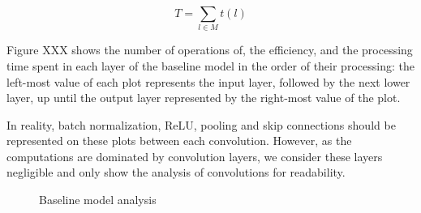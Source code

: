\documentclass[runningheads]{llncs}
\begin{document}
$$T = \sum_{l \in M} t(l)$$



Figure XXX shows the number of operations of, the efficiency, and the processing time spent in each layer of the baseline model in the order of their processing: the left-most value of each plot represents the input layer, followed by the next lower layer, up until the output layer represented by the right-most value of the plot.

In reality, batch normalization, ReLU, pooling and skip connections should be represented on these plots between each convolution.
However, as the computations are dominated by convolution layers, we consider these layers negligible and only show the analysis of convolutions for readability. 


\begin{figure}[h]
\centering
{}%
%
%

\centering
\caption{Baseline model analysis}
\end{figure}
\end{document}
